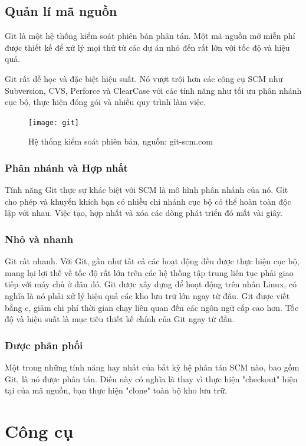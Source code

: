 {{\subsection{Quản lí mã nguồn}

Git là một hệ thống kiểm soát phiên bản phân tán. Một mã nguồn mở miễn phí được thiết kế để xử lý mọi thứ từ các dự án nhỏ đến rất lớn với tốc độ và hiệu quả.

Git rất dễ học và đặc biệt hiệu suất. Nó vượt trội hơn các công cụ SCM như Subversion, CVS, Perforce và ClearCase với các tính năng như tối ưu phân nhánh cục bộ, thực hiện đóng gói và nhiều quy trình làm việc.

\begin{figure}[h!]
	\caption{Hệ thống kiểm soát phiên bản, nguồn: git-scm.com}
	\centering
	\texttt{[image: git]}
	\label{fig:ill:git}
\end{figure}

\subsubsection{Phân nhánh và Hợp nhất}
Tính năng Git thực sự khác biệt với SCM là mô hình phân nhánh của nó.
Git cho phép và khuyến khích bạn có nhiều chi nhánh cục bộ có thể hoàn toàn độc lập với nhau. Việc tạo, hợp nhất và xóa các dòng phát triển đó mất vài giây.

\subsubsection{Nhỏ và nhanh}
Git rất nhanh. Với Git, gần như tất cả các hoạt động đều được thực hiện cục bộ, mang lại lợi thế về tốc độ rất lớn trên các hệ thống tập trung liên tục phải giao tiếp với máy chủ ở đâu đó.
Git được xây dựng để hoạt động trên nhân Linux, có nghĩa là nó phải xử lý hiệu quả các kho lưu trữ lớn ngay từ đầu. Git được viết bằng \acrshort{c}, giảm chi phí thời gian chạy liên quan đến các ngôn ngữ cấp cao hơn. Tốc độ và hiệu suất là mục tiêu thiết kế chính của Git ngay từ đầu.

\subsubsection{Được phân phối}
Một trong những tính năng hay nhất của bất kỳ hệ phân tán SCM nào, bao gồm Git, là nó được phân tán. Điều này có nghĩa là thay vì thực hiện "checkout" hiện tại của mã nguồn, bạn thực hiện "clone" toàn bộ kho lưu trữ.

\section{Công cụ}

}}
